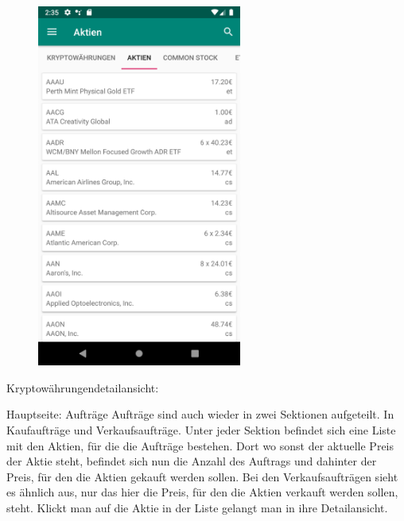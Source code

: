 \documentclass[10pt]{scrartcl}
\begin{document}
\begin{figure}[H]
	\centering
	\includegraphics[width=0.6\textwidth]{Bilder/Applikation/Aktien.png}
\end{figure}

Kryptowährungendetailansicht:


Hauptseite: Aufträge
Aufträge sind auch wieder in zwei Sektionen aufgeteilt. In Kaufaufträge und Verkaufsaufträge. Unter jeder Sektion befindet sich eine Liste mit den Aktien, für die die Aufträge bestehen. Dort wo sonst der aktuelle Preis der Aktie steht, befindet sich nun die Anzahl des Auftrags und dahinter der Preis, für den die Aktien gekauft werden sollen. Bei den Verkaufsaufträgen sieht es ähnlich aus, nur das hier die Preis, für den die Aktien verkauft werden sollen, steht.
Klickt man auf die Aktie in der Liste gelangt man in ihre Detailansicht.
\end{document}
